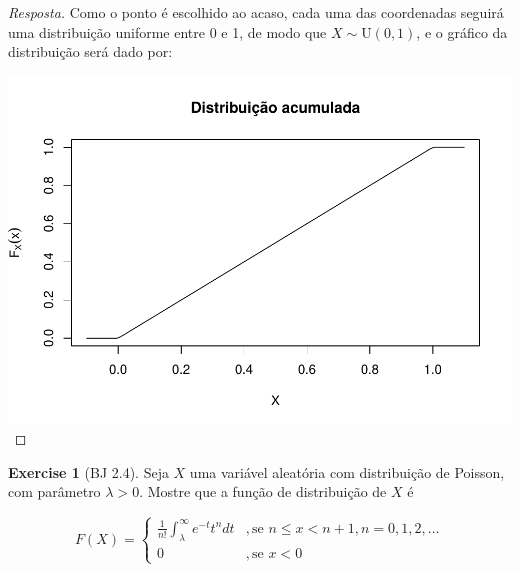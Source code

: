 \documentclass[
]{article}
\theoremstyle{definition}
\theoremstyle{definition}
\theoremstyle{definition}
\newtheorem{exercise}{Exercise}[section]
\theoremstyle{definition}
\theoremstyle{remark}
\begin{document}
\begin{proof}[Resposta]
Como o ponto é escolhido ao acaso, cada uma das coordenadas seguirá uma distribuição uniforme entre 0 e 1, de modo que \(X \sim \mathrm{U}(0,1)\), e o gráfico da distribuição será dado por:

\includegraphics{_main_files/figure-latex/distacumx-1.pdf}
\end{proof}

\begin{exercise}[BJ 2.4]
Seja \(X\) uma variável aleatória com distribuição de Poisson, com parâmetro \(\lambda > 0\). Mostre que a função de distribuição de \(X\) é

\begin{equation*}
F(X) = \begin{cases}
\frac{1}{n!}\int_{\lambda}^{\infty}e^{-t}t^{n}dt & ,\text{se } n \le x < n+1, n = 0,1,2,\ldots \\
0 & ,\text{se } x <0
\end{cases}
\end{equation*}
\end{exercise}
\end{document}
